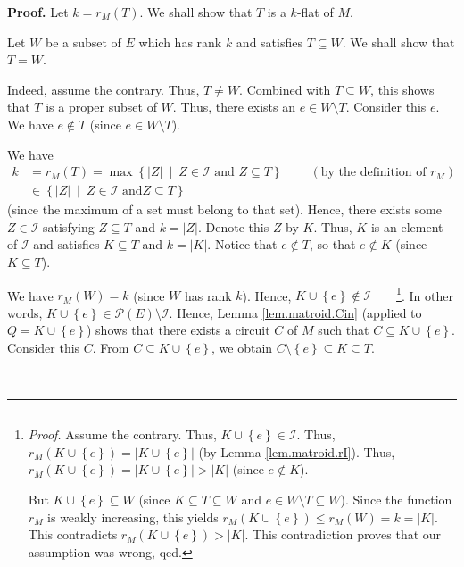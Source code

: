 \documentclass[numbers=enddot,12pt,final,onecolumn,notitlepage]{scrartcl}%
\theoremstyle{definition}
\newenvironment{proof}[1][Proof]{\noindent\textbf{#1.} }{\ \rule{0.5em}{0.5em}}
\begin{document}
\begin{proof}
Let $k=r_{M}\left(  T\right)  $. We shall show that $T$ is a $k$-flat of $M$.

Let $W$ be a subset of $E$ which has rank $k$ and satisfies $T\subseteq W$. We
shall show that $T=W$.

Indeed, assume the contrary. Thus, $T\neq W$. Combined with $T\subseteq W$,
this shows that $T$ is a proper subset of $W$. Thus, there exists an $e\in
W\setminus T$. Consider this $e$. We have $e\notin T$ (since $e\in W\setminus
T$).

We have
\begin{align*}
k  &  =r_{M}\left(  T\right)  =\max\left\{  \left\vert Z\right\vert
\ \mid\ Z\in\mathcal{I}\text{ and }Z\subseteq T\right\}
\ \ \ \ \ \ \ \ \ \ \left(  \text{by the definition of }r_{M}\right) \\
&  \in\left\{  \left\vert Z\right\vert \ \mid\ Z\in\mathcal{I}\text{ and
}Z\subseteq T\right\}
\end{align*}
(since the maximum of a set must belong to that set). Hence, there exists some
$Z\in\mathcal{I}$ satisfying $Z\subseteq T$ and $k=\left\vert Z\right\vert $.
Denote this $Z$ by $K$. Thus, $K$ is an element of $\mathcal{I}$ and satisfies
$K\subseteq T$ and $k=\left\vert K\right\vert $. Notice that $e\notin T$, so
that $e\notin K$ (since $K\subseteq T$).

We have $r_{M}\left(  W\right)  =k$ (since $W$ has rank $k$). Hence,
$K\cup\left\{  e\right\}  \notin\mathcal{I}$\ \ \ \ \footnote{\textit{Proof.}
Assume the contrary. Thus, $K\cup\left\{  e\right\}  \in\mathcal{I}$. Thus,
$r_{M}\left(  K\cup\left\{  e\right\}  \right)  =\left\vert K\cup\left\{
e\right\}  \right\vert $ (by Lemma \ref{lem.matroid.rI}). Thus, $r_{M}\left(
K\cup\left\{  e\right\}  \right)  =\left\vert K\cup\left\{  e\right\}
\right\vert >\left\vert K\right\vert $ (since $e\notin K$).
\par
But $K\cup\left\{  e\right\}  \subseteq W$ (since $K\subseteq T\subseteq W$
and $e\in W\setminus T\subseteq W$). Since the function $r_{M}$ is weakly
increasing, this yields $r_{M}\left(  K\cup\left\{  e\right\}  \right)  \leq
r_{M}\left(  W\right)  =k=\left\vert K\right\vert $. This contradicts
$r_{M}\left(  K\cup\left\{  e\right\}  \right)  >\left\vert K\right\vert $.
This contradiction proves that our assumption was wrong, qed.}. In other
words, $K\cup\left\{  e\right\}  \in\mathcal{P}\left(  E\right)
\setminus\mathcal{I}$. Hence, Lemma \ref{lem.matroid.Cin} (applied to
$Q=K\cup\left\{  e\right\}  $) shows that there exists a circuit $C$ of $M$
such that $C\subseteq K\cup\left\{  e\right\}  $. Consider this $C$. From
$C\subseteq K\cup\left\{  e\right\}  $, we obtain $C\setminus\left\{
e\right\}  \subseteq K\subseteq T$.


\end{proof}
\end{document}
